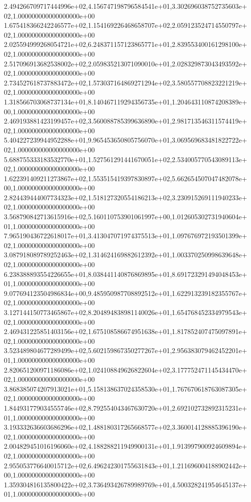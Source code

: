 2.494266709717444996e+02,4.156747198796584541e+01,3.302696038752735603e+02,1.000000000000000000e+00
1.675418366242246577e+02,1.154169226468658707e+02,2.059123524714550797e+02,1.000000000000000000e+00
2.025594999268054721e+02,6.248371157123865771e+01,2.839553400161298100e+02,1.000000000000000000e+00
2.517096913682538002e+02,2.059835213071090010e+01,2.028329873043493592e+02,1.000000000000000000e+00
2.734527618737883472e+02,1.573037164869271294e+02,3.580557708823221219e+02,1.000000000000000000e+00
1.318566703068737134e+01,8.140467119294356735e+01,1.204643110874208389e+00,1.000000000000000000e+00
2.469193881423199457e+02,3.560088785399636890e+01,2.981713546311574419e+02,1.000000000000000000e+00
5.404227239944952288e+01,9.965453650805756070e+01,3.069569683481822722e+02,1.000000000000000000e+00
5.688755333183532770e+01,1.527561291441670051e+02,2.534005770543089113e+02,1.000000000000000000e+00
1.622391409211273867e+02,1.553515419397830897e+02,5.662654507047482078e+00,1.000000000000000000e+00
2.824439444007734323e+02,1.518127320554186213e+02,3.230915269111940233e+02,1.000000000000000000e+00
3.568790842713615916e+02,5.160110753901061997e+00,1.012605302731940604e+01,1.000000000000000000e+00
7.965190436722618017e+01,3.413047071974375513e+01,1.097676972193501399e+02,1.000000000000000000e+00
3.087918089789252463e+02,1.314624169882612392e+01,1.003370250998639648e+02,1.000000000000000000e+00
6.238388893554226655e+01,8.038441140876869895e+01,8.691723291494048453e+01,1.000000000000000000e+00
9.077694123504986834e+00,9.485950987708892512e+01,1.622913239182355767e+02,1.000000000000000000e+00
3.127144150773465867e+02,8.204894838981140026e+01,1.654768452334979543e+02,1.000000000000000000e+00
2.469431225851403156e+02,1.675108586674951638e+01,1.817852407475097891e+02,1.000000000000000000e+00
3.523489804677289499e+02,5.602159867350277267e+01,2.956383079462452201e+01,1.000000000000000000e+00
2.820651200971186086e+02,1.024108849626822604e+02,3.177752471145434470e+02,1.000000000000000000e+00
3.868385074207913021e+01,5.158138637024358530e+01,1.767670618763087305e+02,1.000000000000000000e+00
1.844931779034555746e+02,8.792554043467630720e+01,2.692102732892315231e+01,1.000000000000000000e+00
3.193332636603686296e+02,1.488180317265668577e+02,3.360014128885396190e+02,1.000000000000000000e+00
2.004829451016196060e+02,4.188288211949900131e+01,1.913997900924609894e+02,1.000000000000000000e+00
2.955053776640015712e+02,6.496242301755631843e+01,1.211696004188902442e+00,1.000000000000000000e+00
1.359304816135800422e+02,3.736493426789989769e+01,4.500328241954645137e+01,1.000000000000000000e+00
